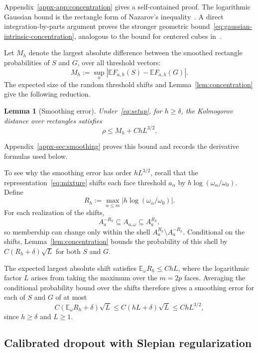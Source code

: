 \documentclass[11pt,letterpaper]{article}
\newtheorem{lemma}{Lemma}
\theoremstyle{remark}
\newcommand{\E}{\mathbb E}
\begin{document}
{
Appendix~\ref{appx-app:concentration} gives a self-contained proof.
The logarithmic Gaussian bound is the rectangle form of Nazarov's
inequality~\cite[Lemma~A.1]{CCK2017}. A direct integration-by-parts
argument proves the stronger geometric
bound~\eqref{eq:gaussian-intrinsic-concentration}, analogous to the
bound for centered cubes in~\cite[Theorem~3 and Comment~5]{CCK2015AC}.
}

{Let \(M_h\) denote the largest absolute difference between the
smoothed rectangle probabilities of \(S\) and \(G\), over all threshold vectors:}
\[
 M_h:=\sup_a|\E F_{a,h}(S)-\E F_{a,h}(G)|.
\]
{The expected size of the random threshold shifts and
Lemma~\ref{lem:concentration} give the following reduction.}
\begin{lemma}[Smoothing error]\label{lem:endpoint}
Under~\eqref{eq:setup}, for \(h\ge\delta\), the {Kolmogorov distance over rectangles satisfies}
\begin{equation}
 \rho\le M_h+ChL^{3/2}.
 \label{eq:endpoint-min}
\end{equation}
\end{lemma}
Appendix~\ref{appx-sec:smoothing} proves this bound and records the
derivative formulas used below. {To see why the smoothing error has
order \(hL^{3/2}\), recall that the representation~\eqref{eq:mixture}
shifts each face threshold \(a_\alpha\) by
\(h\log(\omega_\alpha/\omega_0)\). {Define}
\[
 R_h:=\max_{\alpha\le m}
 \bigl|h\log(\omega_\alpha/\omega_0)\bigr|.
\]
For each realization of the shifts,
\[
 A_a^{-R_h}\subseteq A_{a,\omega}\subseteq A_a^{R_h},
\]
so membership can change only within the shell
\(A_a^{R_h}\setminus A_a^{-R_h}\). Conditional on the shifts,
Lemma~\ref{lem:concentration} bounds the probability of this shell
by \(C(R_h+\delta)\sqrt L\) {for both \(S\) and \(G\).}

The expected largest absolute shift satisfies \(\E_\omega R_h\le ChL\),
where the logarithmic factor \(L\) arises from taking the maximum over the
\(m=2p\) faces. Averaging the conditional probability bound over the shifts
therefore gives {a smoothing error for each of \(S\) and \(G\)} of at most
\[
 C(\E_\omega R_h+\delta)\sqrt L
 \le C(hL+\delta)\sqrt L
 \le ChL^{3/2},
\]
since \(h\ge\delta\) and \(L\ge1\).}


\subsection{Calibrated dropout with Slepian regularization}
\label{sec:outline-path}
\end{document}
